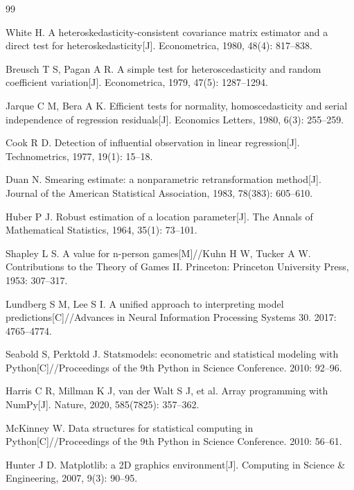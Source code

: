 \begin{thebibliography}{99}

 White H. A heteroskedasticity-consistent covariance matrix estimator and a direct test for heteroskedasticity[J]. Econometrica, 1980, 48(4): 817--838.

 Breusch T S, Pagan A R. A simple test for heteroscedasticity and random coefficient variation[J]. Econometrica, 1979, 47(5): 1287--1294.

 Jarque C M, Bera A K. Efficient tests for normality, homoscedasticity and serial independence of regression residuals[J]. Economics Letters, 1980, 6(3): 255--259.

 Cook R D. Detection of influential observation in linear regression[J]. Technometrics, 1977, 19(1): 15--18.

 Duan N. Smearing estimate: a nonparametric retransformation method[J]. Journal of the American Statistical Association, 1983, 78(383): 605--610.

 Huber P J. Robust estimation of a location parameter[J]. The Annals of Mathematical Statistics, 1964, 35(1): 73--101.

 Shapley L S. A value for n-person games[M]//Kuhn H W, Tucker A W. Contributions to the Theory of Games II. Princeton: Princeton University Press, 1953: 307--317.

 Lundberg S M, Lee S I. A unified approach to interpreting model predictions[C]//Advances in Neural Information Processing Systems 30. 2017: 4765--4774.

 Seabold S, Perktold J. Statsmodels: econometric and statistical modeling with Python[C]//Proceedings of the 9th Python in Science Conference. 2010: 92--96.

 Harris C R, Millman K J, van der Walt S J, et al. Array programming with NumPy[J]. Nature, 2020, 585(7825): 357--362.

 McKinney W. Data structures for statistical computing in Python[C]//Proceedings of the 9th Python in Science Conference. 2010: 56--61.

 Hunter J D. Matplotlib: a 2D graphics environment[J]. Computing in Science \& Engineering, 2007, 9(3): 90--95.

\end{thebibliography}
